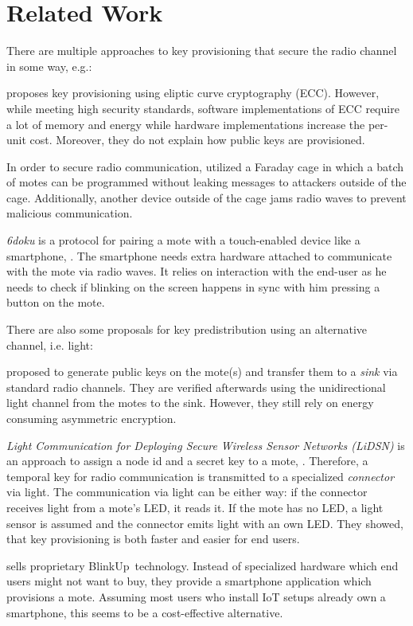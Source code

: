 \documentclass{sig-alternate} %
\begin{document}
\section{Related Work}
\label{sec:related_work}

There are multiple approaches to key provisioning that secure the radio channel in some way, e.g.:

\cite{chen2011over} proposes key provisioning using eliptic curve cryptography (ECC).
However, while meeting high security standards, software implementations of ECC require a lot of memory and energy while hardware implementations increase the per-unit cost.
Moreover, they do not explain how public keys are provisioned.

In order to secure radio communication, \cite{kuo2007message} utilized a Faraday cage in which a batch of motes can be programmed without leaking messages to attackers outside of the cage.
Additionally, another device outside of the cage jams radio waves to prevent malicious communication.

\textit{6doku} is a protocol for pairing  a mote with a touch-enabled device like a smartphone, \cite{krentz20156doku}.
The smartphone needs extra hardware attached to communicate with the mote via radio waves.
It relies on interaction with the end-user as he needs to check if blinking on the screen happens in sync with him pressing a button on the mote.

There are also some proposals for key predistribution using an alternative channel, i.e. light:

\cite{saxena2009blink} proposed to generate public keys on the mote(s) and transfer them to a \textit{sink} via standard radio channels.
They are verified afterwards using the unidirectional light channel from the motes to the sink.
However, they still rely on energy consuming asymmetric encryption.

\textit{Light Communication for Deploying Secure Wireless Sensor Networks (LiDSN)} is an approach to assign a node id and a secret key to a mote, \cite{doan2012lidsn}.
Therefore, a temporal key for radio communication is transmitted to a specialized \textit{connector} via light.
The communication via light can be either way: if the connector receives light from a mote's LED, it reads it. 
If the mote has no LED, a light sensor is assumed and the connector emits light with an own LED.
They showed, that key provisioning is both faster and easier for end users.

\cite{electricimp} sells proprietary BlinkUp~\texttrademark  technology.
Instead of specialized hardware which end users might not want to buy, they provide a smartphone application which provisions a mote.
Assuming most users who install IoT setups already own a smartphone, this seems to be a cost-effective alternative.
\end{document}
